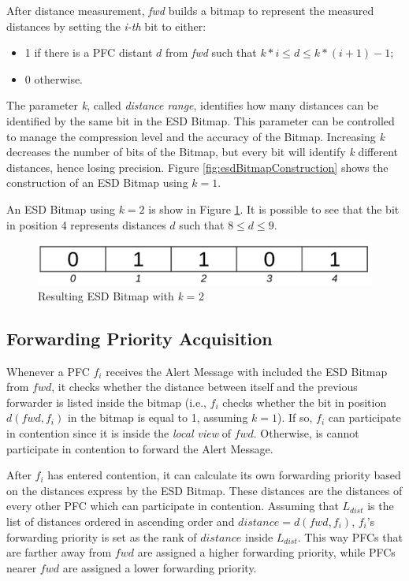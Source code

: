 			After distance measurement, \textit{fwd} builds a bitmap to represent the measured distances by setting the \textit{i-th} bit to either:
			\begin{itemize}
				\item 1 if there is a PFC distant $d$ from \textit{fwd} such that $k * i \leq d \leq k * ( i + 1 ) - 1$;
				\item 0 otherwise.
			\end{itemize} 
			The parameter \textit{k}, called \textit{distance range}, identifies how many distances can be identified by the same bit in the ESD Bitmap. This parameter can be controlled to manage the compression level and the accuracy of the Bitmap. Increasing \textit{k} decreases the number of bits of the Bitmap, but every bit will identify \textit{k} different distances, hence losing precision.
			Figure \ref{fig:esdBitmapConstruction} shows the construction of an ESD Bitmap using $k = 1$.
			
			
			An ESD Bitmap using $k = 2$ is show in Figure \ref{fig:esdBitmapConstructionK2}. It is possible to see that the bit in position 4 represents distances $d$ such that $8 \leq d \leq 9$. 
			
			\begin{figure}[H]
				\centering
				\includegraphics[width=\textwidth]{immagini/esdBitmapConstructionK2}
				\caption{Resulting ESD Bitmap with \textit{k} = 2}
				\label{fig:esdBitmapConstructionK2}
			\end{figure}
		
		\subsection{Forwarding Priority Acquisition}
			Whenever a PFC $f_i$ receives the Alert Message with included the ESD Bitmap from $fwd$, it checks whether the distance between itself and the previous forwarder is listed inside the bitmap (i.e., $f_i$ checks whether the bit in position $d(fwd, f_i)$ in the bitmap is equal to 1, assuming $k = 1$). If so, $f_i$ can participate in contention since it is inside the \textit{local view} of $fwd$. Otherwise, is cannot participate in contention to forward the Alert Message.
			
			
			After $f_i$ has entered contention, it can calculate its own forwarding priority based on the distances express by the ESD Bitmap. These distances are the distances of every other PFC which can participate in contention. Assuming that $L_{dist}$ is the list of distances ordered in ascending order and $distance = d(fwd, f_i)$, $f_i$'s forwarding priority is set as the rank of $distance$ inside $L_{dist}$. This way PFCs that are farther away from $fwd$ are assigned a higher forwarding priority, while PFCs nearer $fwd$ are assigned a lower forwarding priority.
			
